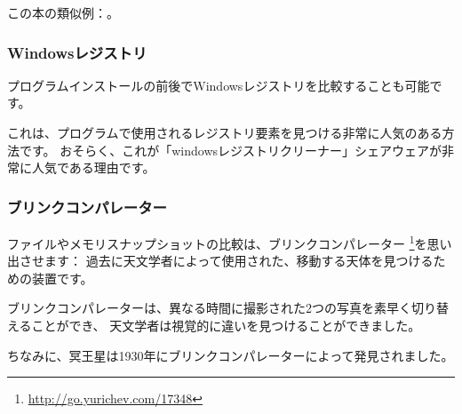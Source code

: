 この本の類似例：。


\subsubsection{Windowsレジストリ}

プログラムインストールの前後でWindowsレジストリを比較することも可能です。

これは、プログラムで使用されるレジストリ要素を見つける非常に人気のある方法です。
おそらく、これが「windowsレジストリクリーナー」シェアウェアが非常に人気である理由です。

\subsubsection{ブリンクコンパレーター}

ファイルやメモリスナップショットの比較は、ブリンクコンパレーター
\footnote{\url{http://go.yurichev.com/17348}}を思い出させます：
過去に天文学者によって使用された、移動する天体を見つけるための装置です。

ブリンクコンパレーターは、異なる時間に撮影された2つの写真を素早く切り替えることができ、
天文学者は視覚的に違いを見つけることができました。

ちなみに、冥王星は1930年にブリンクコンパレーターによって発見されました。